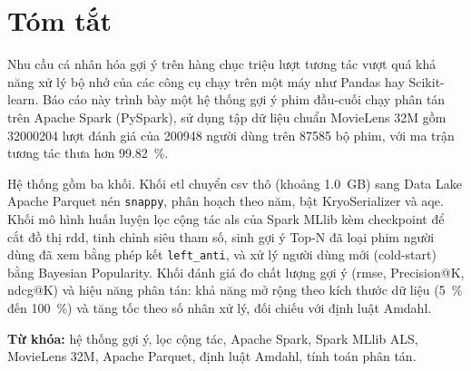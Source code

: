 \chapter*{Tóm tắt}
\thispagestyle{empty}

Nhu cầu cá nhân hóa gợi ý trên hàng chục triệu lượt tương tác vượt quá khả năng xử lý bộ nhớ của các công cụ chạy trên một máy như Pandas hay Scikit-learn. Báo cáo này trình bày một hệ thống gợi ý phim đầu-cuối chạy phân tán trên Apache Spark (PySpark), sử dụng tập dữ liệu chuẩn MovieLens 32M gồm \num{32000204} lượt đánh giá của \num{200948} người dùng trên \num{87585} bộ phim, với ma trận tương tác thưa hơn \SI{99,82}{\percent}.

Hệ thống gồm ba khối. Khối \gls{etl} chuyển \gls{csv} thô (khoảng \SI{1,0}{GB}) sang Data Lake Apache Parquet nén \texttt{snappy}, phân hoạch theo năm, bật KryoSerializer và \gls{aqe}. Khối mô hình huấn luyện lọc cộng tác \gls{als} của Spark MLlib kèm checkpoint để cắt đồ thị \gls{rdd}, tinh chỉnh siêu tham số, sinh gợi ý Top-N đã loại phim người dùng đã xem bằng phép kết \texttt{left\_anti}, và xử lý người dùng mới (cold-start) bằng Bayesian Popularity. Khối đánh giá đo chất lượng gợi ý (\gls{rmse}, Precision@K, \gls{ndcg}@K) và hiệu năng phân tán: khả năng mở rộng theo kích thước dữ liệu (\SI{5}{\percent} đến \SI{100}{\percent}) và tăng tốc theo số nhân xử lý, đối chiếu với định luật Amdahl.


\vspace{0.5em}
\noindent\textbf{Từ khóa:} hệ thống gợi ý, lọc cộng tác, Apache Spark, Spark MLlib ALS, MovieLens 32M, Apache Parquet, định luật Amdahl, tính toán phân tán.
